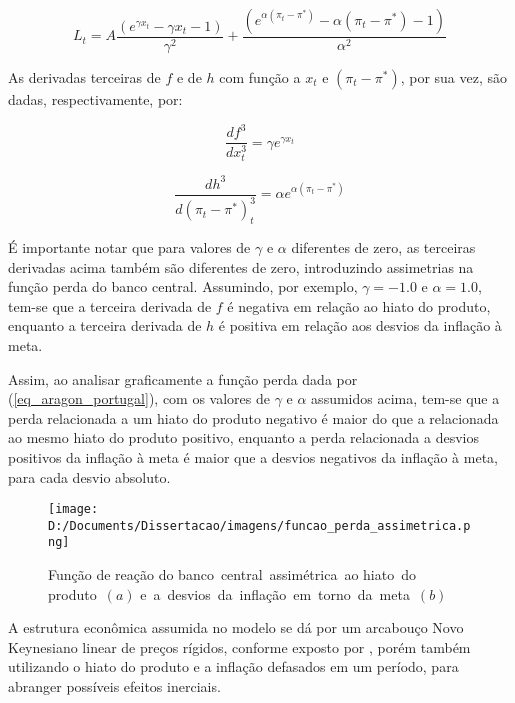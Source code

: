 \documentclass[
	article,			%
	11pt,				%
	oneside,			%
	a4paper,			%
	english,			%
	brazil,				%
	]{abntex2}
\begin{document}
	\begin{equation} \label{eq_aragon_portugal}
		L_t = A \frac{(e^{\gamma x_t} - \gamma x_t - 1)}{\gamma^2} + \frac{(e^{\alpha (\pi_t - \pi^*)} - \alpha (\pi_t - \pi^*) - 1)}{\alpha^2}
	\end{equation}
	
	As derivadas terceiras de $f$ e de $h$ com função a $x_t$ e $(\pi_t - \pi^*)$, por sua vez, são dadas, respectivamente, por:
	
	\begin{equation}
		\frac{df^3}{dx_t^3} = \gamma e^{\gamma x_t}
	\end{equation}
	
	\begin{equation}
		\frac{dh^3}{d(\pi_t - \pi^*)_t^3} = \alpha e^{\alpha (\pi_t - \pi^*)}
	\end{equation}
	
	É importante notar que para valores de $\gamma$ e $\alpha$ diferentes de zero, as terceiras derivadas acima também são diferentes de zero, introduzindo assimetrias na função perda do banco central. Assumindo, por exemplo, $\gamma = -1.0$ e $\alpha = 1.0$, tem-se que a terceira derivada de $f$ é negativa em relação ao hiato do produto, enquanto a terceira derivada de $h$ é positiva em relação aos desvios da inflação à meta.
	
	Assim, ao analisar graficamente a função perda dada por (\ref{eq_aragon_portugal}), com os valores de $\gamma$ e $\alpha$ assumidos acima, tem-se que a perda relacionada a um hiato do produto negativo é maior do que a relacionada ao mesmo hiato do produto positivo, enquanto a perda relacionada a desvios positivos da inflação à meta é maior que a desvios negativos da inflação à meta, para cada desvio absoluto.
		
	\hfill \break
	\hfill \break
	\hfill \break
	\hfill \break
	\hfill \break

	\begin{figure}[!h]
	\texttt{[image: D:/Documents/Dissertacao/imagens/funcao\_perda\_assimetrica.png]}
	\caption{Função de reação do banco~central~assimétrica~ao hiato~do produto~$(a)$ e~a~desvios~da~inflação~em~torno~da~meta~$(b)$}
	\label{fig:funcao reacao assimetrica}
	\end{figure}
	
	A estrutura econômica assumida no modelo se dá por um arcabouço Novo Keynesiano linear de preços rígidos, conforme exposto por , porém também utilizando o hiato do produto e a inflação defasados em um período, para abranger possíveis efeitos inerciais.
		
\end{document}
